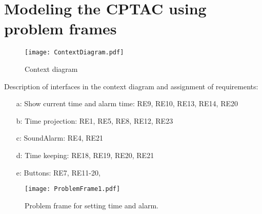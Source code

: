 \documentclass[Main_Assignment2]{subfiles}
\begin{document}
\section{Modeling the CPTAC using problem frames}


\begin{figure}[H]
\centering
\texttt{[image: ContextDiagram.pdf]}
\caption{Context diagram}
\label{fig:contextDiagram}
\end{figure}

Description of interfaces in the context diagram and assignment of requirements:
\begin{enumerate}
	\item[a:] Show current time and alarm time: RE9, RE10, RE13, RE14, RE20
	\item[b:] Time projection: RE1, RE5, RE8, RE12, RE23
	\item[c:] SoundAlarm: RE4, RE21
	\item[d:] Time keeping: RE18, RE19, RE20, RE21
	\item[e:] Buttons: RE7, RE11-20, 
\end{enumerate}
	


\begin{figure}[H]
\centering
\texttt{[image: ProblemFrame1.pdf]}
\caption{Problem frame for setting time and alarm.}
\label{fig:problemFrame}
\end{figure}
\end{document}
